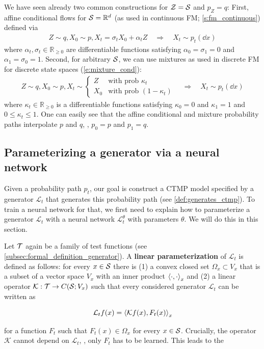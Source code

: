 \documentclass{fairmeta}
\newcommand{\highlight}[1]{{\color{metablue} \textbf{#1}}}
\numberwithin{equation}{section}
\begin{document}
We have seen already two common constructions for ${\mathcal{Z}} = {\mathcal{S}}$ and $p_{Z}=q$: First, affine conditional flows for ${\mathcal{S}}=\mathbb{R}^d$ (as used in continuous FM; \cref{s:fm_continuous}) defined via
\begin{align}
Z\sim q, X_0\sim p, X_t=\sigma_t X_0+\alpha_t Z\quad \Rightarrow \quad X_t\sim p_t(\dd x)
\end{align}
where $\alpha_t,\sigma_t\in \mathbb{R}_{\geq 0}$ are differentiable functions satisfying $\alpha_0=\sigma_1=0$ and $\alpha_1=\sigma_0=1$. Second, for arbitrary ${\mathcal{S}}$, we can use mixtures as used in discrete FM for discrete state spaces (\cref{e:mixture_cond}):
\begin{align}
\label{eq:general_definition_mixture}
Z\sim q, X_0\sim p, X_t \sim \begin{cases}
        Z & \text{with prob } \kappa_t\\
        X_0 & \text{with prob } (1-\kappa_t)
    \end{cases}\quad \Rightarrow \quad X_t\sim p_t(\dd x)
\end{align}
where $\kappa_t\in \mathbb{R}_{\geq 0}$ is a differentiable functions satisfying $\kappa_0=0$ and $\kappa_1=1$ and $0\leq \kappa_t\leq 1$. One can easily see that the affine conditional and mixture probability paths interpolate $p$ and $q$, \ie, $p_0=p$ and $p_1=q$.

\subsection{Parameterizing a generator via a neural network}
Given a probability path $p_t$, our goal is construct a CTMP model specified by a generator $\mathcal{L}_t$ that generates this probability path (see \cref{def:generates_ctmp}). To train a neural network for that, we first need to explain how to parameterize a generator $\mathcal{L}_t$ with a neural network $\mathcal{L}_t^\theta$ with parameters $\theta$. We will do this in this section.



Let ${\mathcal{T}}$ again be a family of test functions (see \cref{subsec:formal_definition_generator}). A \highlight{linear parameterization} of $\mathcal{L}_t$ is defined as follows: for every $x\in{\mathcal{S}}$ there is (1) a convex closed set $\Omega_{x}\subset V_{x}$ that is a subset of a vector space $V_{x}$ with an inner product $\left \langle \cdot,\cdot \right \rangle_{x}$ and (2) a linear operator $\mathcal{K}:\mathcal{T}\to C({\mathcal{S}};V_x)$ such that every considered generator $\mathcal{L}_t$ can be written as 
\begin{myframe}
\begin{equation}
\label{eq:linear_parameterization}
\mathcal{L}_tf(x)=\left \langle \mathcal{K}f(x),F_t(x) \right \rangle_{x}
\end{equation}
\end{myframe}
for a function $F_t$ such that $F_t(x)\in\Omega_{x}$ for every $x\in{\mathcal{S}}$. Crucially, the operator $\mathcal{K}$ cannot depend on $\mathcal{L}_t$, \ie, only $F_t$ has to be learned. This leads to the
\end{document}
